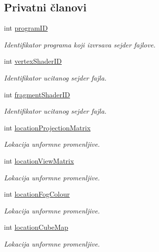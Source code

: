 \subsection*{Privatni članovi}
\begin{DoxyCompactItemize}
\item 
int \hyperlink{classshader_1_1SkyboxShader_a49d2262bba368bf6b24f32e645d7cc3d}{program\+ID}
\begin{DoxyCompactList}\small\item\em Identifikator programa koji izvrsava sejder fajlove. \end{DoxyCompactList}\item 
int \hyperlink{classshader_1_1SkyboxShader_ad0770dc09d144e47273dc691e3aec00c}{vertex\+Shader\+ID}
\begin{DoxyCompactList}\small\item\em Identifikator ucitanog sejder fajla. \end{DoxyCompactList}\item 
int \hyperlink{classshader_1_1SkyboxShader_a149d67af113a2f81247d4cbe573d32fa}{fragment\+Shader\+ID}
\begin{DoxyCompactList}\small\item\em Identifikator ucitanog sejder fajla. \end{DoxyCompactList}\item 
int \hyperlink{classshader_1_1SkyboxShader_aac607fdddcc532a76dd9e42caa6828d8}{location\+Projection\+Matrix}
\begin{DoxyCompactList}\small\item\em Lokacija unformne promenljive. \end{DoxyCompactList}\item 
int \hyperlink{classshader_1_1SkyboxShader_a6c31cfe83864808df46064a4f9c29aa7}{location\+View\+Matrix}
\begin{DoxyCompactList}\small\item\em Lokacija unformne promenljive. \end{DoxyCompactList}\item 
int \hyperlink{classshader_1_1SkyboxShader_a80bdb1b20baf13d123500d8c16f9900d}{location\+Fog\+Colour}
\begin{DoxyCompactList}\small\item\em Lokacija unformne promenljive. \end{DoxyCompactList}\item 
int \hyperlink{classshader_1_1SkyboxShader_a72b916251cca075201956fcc9cb08c38}{location\+Cube\+Map}
\begin{DoxyCompactList}\small\item\em Lokacija unformne promenljive. \end{DoxyCompactList}\item 

\end{DoxyCompactItemize}
